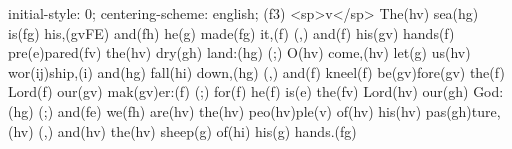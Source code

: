 initial-style: 0;
centering-scheme: english;
(f3) <sp>v</sp> The(hv) sea(hg) is(fg) his,(gvFE) and(fh) he(g) made(fg) it,(f) (,) and(f) his(gv) hands(f) pre(e)pared(fv) the(hv) dry(gh) land:(hg) (;) O(hv) come,(hv) let(g) us(hv) wor(ij)ship,(i) and(hg) fall(hi) down,(hg) (,) and(f) kneel(f) be(gv)fore(gv) the(f) Lord(f) our(gv) mak(gv)er:(f) (;) for(f) he(f) is(e) the(fv) Lord(hv) our(gh) God:(hg) (;) and(fe) we(fh) are(hv) the(hv) peo(hv)ple(v) of(hv) his(hv) pas(gh)ture,(hv) (,) and(hv) the(hv) sheep(g) of(hi) his(g) hands.(fg)
